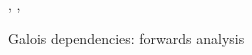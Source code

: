 \begin{figure}
{    \begin{smathpar}
       {
          \upgamma, \uprho, \upalpha
          \closeDefsFwdR
       }
    \end{smathpar}
    }

    \caption{Galois dependencies: forwards analysis}
    \end{figure}
